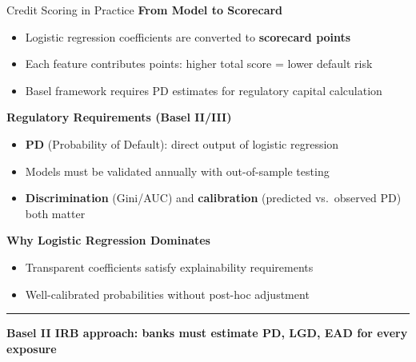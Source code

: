 \documentclass[8pt,aspectratio=169]{beamer}
\newcommand{\bottomnote}[1]{%
\vfill
\vspace{-2mm}
\textcolor{mllavender2}{\rule{\textwidth}{0.4pt}}
\vspace{1mm}
\footnotesize
\textbf{#1}
}
\begin{document}
\begin{frame}[t]{Credit Scoring in Practice}
\textbf{From Model to Scorecard}
\begin{itemize}
  \item Logistic regression coefficients are converted to \textbf{scorecard points}
  \item Each feature contributes points: higher total score = lower default risk
  \item Basel framework requires PD estimates for regulatory capital calculation
\end{itemize}

\vspace{0.5em}
\textbf{Regulatory Requirements (Basel II/III)}
\begin{itemize}
  \item \textbf{PD} (Probability of Default): direct output of logistic regression
  \item Models must be validated annually with out-of-sample testing
  \item \textbf{Discrimination} (Gini/AUC) and \textbf{calibration} (predicted vs.\ observed PD) both matter
\end{itemize}

\vspace{0.3em}
\textbf{Why Logistic Regression Dominates}
\begin{itemize}
  \item Transparent coefficients satisfy explainability requirements
  \item Well-calibrated probabilities without post-hoc adjustment
\end{itemize}
\bottomnote{Basel II IRB approach: banks must estimate PD, LGD, EAD for every exposure}
\end{frame}
\end{document}
